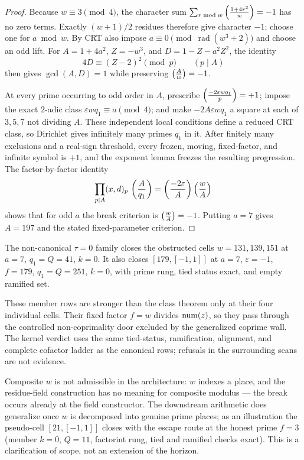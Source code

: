\begin{proof}
Because $w\equiv3\pmod4$, the character sum
$\sum_{r\bmod w}\left(\frac{1+4r^2}{w}\right)=-1$ has no zero terms.  Exactly
$(w+1)/2$ residues therefore give character $-1$; choose one for $a\bmod
w$.  By CRT also impose
$a\equiv0\pmod{\operatorname{rad}(w^3+2)}$ and choose an odd lift.  For
$A=1+4a^2$, $Z=-w^3$, and $D=1-Z-a^2Z^2$, the identity
\[
 4D\equiv(Z-2)^2\pmod p\qquad(p\mid A)
\]
then gives $\gcd(A,D)=1$ while preserving $\left(\frac{A}{w}\right)=-1$.

At every prime occurring to odd order in $A$, prescribe
$\left(\frac{-2\varepsilon wq_1}{p}\right)=+1$; impose the exact $2$-adic class
$\varepsilon wq_1\equiv a\pmod4$; and make
$-2A\varepsilon wq_1$ a square at each of $3,5,7$ not dividing $A$.
These independent local conditions define a reduced CRT class, so
Dirichlet gives infinitely many primes $q_1$ in it.  After finitely many
exclusions and a real-sign threshold, every frozen, moving, fixed-factor,
and infinite symbol is $+1$, and the exponent lemma freezes the resulting
progression.  The factor-by-factor identity
\[
 \prod_{p\mid A}(x,d)_p\,\left(\frac{A}{q_1}\right)
   =\left(\frac{-2\varepsilon}{A}\right)\left(\frac{w}{A}\right)
\]
shows that for odd $a$ the break criterion is $\left(\frac{w}{A}\right)=-1$.
Putting $a=7$ gives $A=197$ and the stated fixed-parameter criterion.
\end{proof}

\begin{proposition}
The non-canonical $\tau=0$ family closes the obstructed cells
$w=131,139,151$ at $a=7$, $q_1=Q=41$, $k=0$.  It also closes
$[179,[-1,1]]$ at $a=7$, $\varepsilon=-1$, $f=179$,
$q_1=Q=251$, $k=0$, with prime rung, tied status exact, and empty
ramified set.
\end{proposition}

These member rows are stronger than the class theorem only at their four
individual cells.  Their fixed factor $f=w$ divides $\operatorname{num}(z)$, so they pass
through the controlled non-coprimality door excluded by the generalized
coprime wall.  The kernel verdict uses the same tied-status, ramification,
alignment, and complete cofactor ladder as the canonical rows; refusals in
the surrounding scans are not evidence.

\begin{remark}[Composite $w$]
Composite $w$ is not admissible in the architecture: $w$ indexes a
place, and the residue-field construction has no meaning for composite
modulus --- the break occurs already at the field constructor. The
downstream arithmetic does generalize once $w$ is decomposed into
genuine prime places; as an illustration the pseudo-cell
$[21,[-1,1]]$ closes with the escape route at the honest prime $f = 3$
(member $k=0$, $Q=11$, factorint rung, tied and ramified checks exact).
This is a clarification of scope, not an extension of the horizon.
\end{remark}
